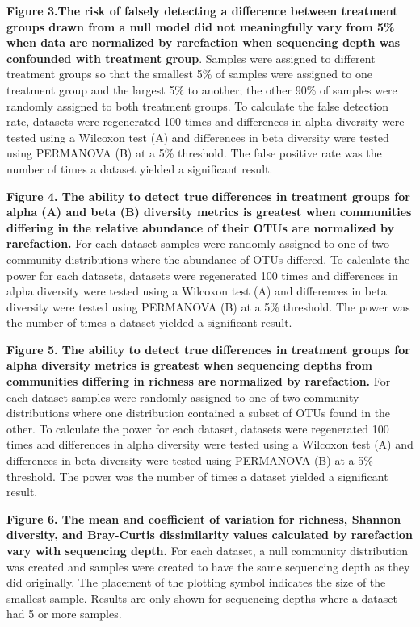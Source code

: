 \documentclass[
]{article}
\begin{document}
\textbf{Figure 3.The risk of falsely detecting a difference between
treatment groups drawn from a null model did not meaningfully vary from
5\% when data are normalized by rarefaction when sequencing depth was
confounded with treatment group}. Samples were assigned to different
treatment groups so that the smallest 5\% of samples were assigned to
one treatment group and the largest 5\% to another; the other 90\% of
samples were randomly assigned to both treatment groups. To calculate
the false detection rate, datasets were regenerated 100 times and
differences in alpha diversity were tested using a Wilcoxon test (A) and
differences in beta diversity were tested using PERMANOVA (B) at a 5\%
threshold. The false positive rate was the number of times a dataset
yielded a significant result.

\textbf{Figure 4. The ability to detect true differences in treatment
groups for alpha (A) and beta (B) diversity metrics is greatest when
communities differing in the relative abundance of their OTUs are
normalized by rarefaction.} For each dataset samples were randomly
assigned to one of two community distributions where the abundance of
OTUs differed. To calculate the power for each datasets, datasets were
regenerated 100 times and differences in alpha diversity were tested
using a Wilcoxon test (A) and differences in beta diversity were tested
using PERMANOVA (B) at a 5\% threshold. The power was the number of
times a dataset yielded a significant result.

\textbf{Figure 5. The ability to detect true differences in treatment
groups for alpha diversity metrics is greatest when sequencing depths
from communities differing in richness are normalized by rarefaction.}
For each dataset samples were randomly assigned to one of two community
distributions where one distribution contained a subset of OTUs found in
the other. To calculate the power for each dataset, datasets were
regenerated 100 times and differences in alpha diversity were tested
using a Wilcoxon test (A) and differences in beta diversity were tested
using PERMANOVA (B) at a 5\% threshold. The power was the number of
times a dataset yielded a significant result.

\textbf{Figure 6. The mean and coefficient of variation for richness,
Shannon diversity, and Bray-Curtis dissimilarity values calculated by
rarefaction vary with sequencing depth.} For each dataset, a null
community distribution was created and samples were created to have the
same sequencing depth as they did originally. The placement of the
plotting symbol indicates the size of the smallest sample. Results are
only shown for sequencing depths where a dataset had 5 or more samples.
\end{document}
